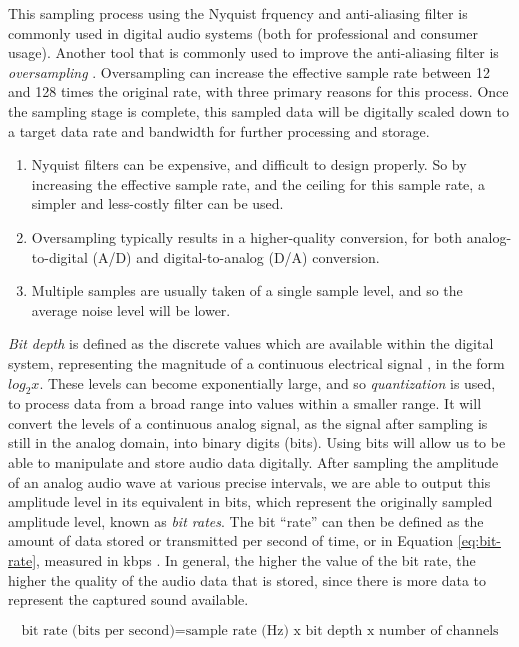 This sampling process using the Nyquist frquency and anti-aliasing filter is commonly used in digital audio systems (both for professional and consumer usage). Another tool that is commonly used to improve the anti-aliasing filter is \textit{oversampling} \cite{Huber_Runstein_2018}. Oversampling can increase the effective sample rate between 12 and 128 times the original rate, with three primary reasons for this process. Once the sampling stage is complete, this sampled data will be digitally scaled down to a target data rate and bandwidth for further processing and storage.

\begin{enumerate}
	\item Nyquist filters can be expensive, and difficult to design properly. So by increasing the effective sample rate, and the ceiling for this sample rate, a simpler and less-costly filter can be used.
	\item Oversampling typically results in a higher-quality conversion, for both analog-to-digital (A/D) and digital-to-analog (D/A) conversion.
	\item Multiple samples are usually taken of a single sample level, and so the average noise level will be lower.
\end{enumerate}

\textit{Bit depth} is defined as the discrete values which are available within the digital system, representing the magnitude of a continuous electrical signal \cite{Zjalic_2021}, in the form $log_2{x}$. These levels can become exponentially large, and so \textit{quantization} is used, to process data from a broad range into values within a smaller range. It will convert the levels of a continuous analog signal, as the signal after sampling is still in the analog domain, into binary digits (bits). Using bits will allow us to be able to manipulate and store audio data digitally. After sampling the amplitude of an analog audio wave at various precise intervals, we are able to output this amplitude level in its equivalent in bits, which represent the originally sampled amplitude level, known as \textit{bit rates}. The bit ``rate'' can then be defined as the amount of data stored or transmitted per second of time, or in Equation \ref{eq:bit-rate}, measured in kbps \cite{Zjalic_2021}. In general, the higher the value of the bit rate, the higher the quality of the audio data that is stored, since there is more data to represent the captured sound available.

\begin{equation}
	\textrm{bit rate (bits per second)} = \textrm{sample rate (Hz) x } \textrm{bit depth x } \textrm{number of channels}
	\label{eq:bit-rate}	
\end{equation}

